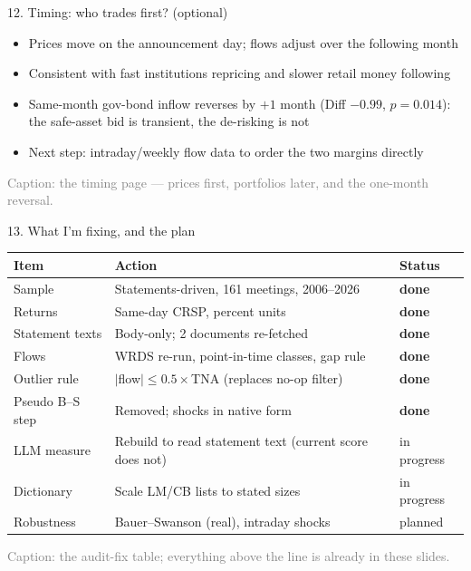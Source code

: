 \documentclass[aspectratio=169, 11pt]{beamer}
\begin{document}
\begin{frame}{12. Timing: who trades first? (optional)}
  \begin{itemize}
    \item Prices move on the announcement day; flows adjust over the following month
    \item Consistent with fast institutions repricing and slower retail money following
    \item Same-month gov-bond inflow reverses by $+1$ month (Diff $-0.99$, $p=0.014$): the safe-asset bid is
          transient, the de-risking is not
    \item Next step: intraday/weekly flow data to order the two margins directly
  \end{itemize}
  {\scriptsize\textcolor{gray}{Caption: the timing page --- prices first, portfolios later, and the one-month reversal.}}
\end{frame}

\begin{frame}{13. What I'm fixing, and the plan}
  \footnotesize
  \begin{tabularx}{\textwidth}{l X l}
    \toprule
    \textbf{Item} & \textbf{Action} & \textbf{Status} \\
    \midrule
    Sample & Statements-driven, 161 meetings, 2006--2026 & \textbf{done} \\
    Returns & Same-day CRSP, percent units & \textbf{done} \\
    Statement texts & Body-only; 2 documents re-fetched & \textbf{done} \\
    Flows & WRDS re-run, point-in-time classes, gap rule & \textbf{done} \\
    Outlier rule & $|$flow$| \leq 0.5\times$TNA (replaces no-op filter) & \textbf{done} \\
    Pseudo B--S step & Removed; shocks in native form & \textbf{done} \\
    LLM measure & Rebuild to read statement text (current score does not) & in progress \\
    Dictionary & Scale LM/CB lists to stated sizes & in progress \\
    Robustness & Bauer--Swanson (real), intraday shocks & planned \\
    \bottomrule
  \end{tabularx}
  {\scriptsize\textcolor{gray}{Caption: the audit-fix table; everything above the line is already in these slides.}}
\end{frame}
\end{document}
